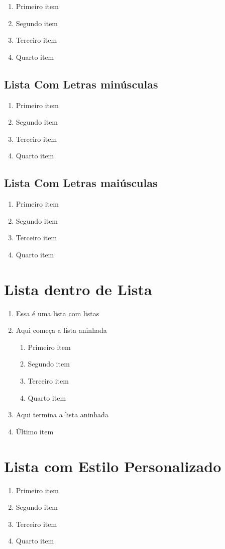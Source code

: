 \documentclass[12pt,a4paper]{article}
\begin{document}
\begin{enumerate}[label=\Roman*]
  \item Primeiro item
  \item Segundo item
  \item Terceiro item
  \item Quarto item
\end{enumerate}

\subsection{Lista Com Letras minúsculas}

\begin{enumerate}[label=\alph*]
  \item Primeiro item
  \item Segundo item
  \item Terceiro item
  \item Quarto item
\end{enumerate}

\subsection{Lista Com Letras maiúsculas}

\begin{enumerate}[label=\Alph*]
  \item Primeiro item
  \item Segundo item
  \item Terceiro item
  \item Quarto item
\end{enumerate}

\section{Lista dentro de Lista}

\begin{enumerate}
\item Essa é uma lista com listas
\item Aqui começa a lista aninhada
  \begin{enumerate}
  \item Primeiro item
  \item Segundo item
  \item Terceiro item
  \item Quarto item
  \end{enumerate}
\item Aqui termina a lista aninhada
\item Último item
\end{enumerate}

\section{Lista com Estilo Personalizado}

\begin{enumerate}[label=\textbf{Item \arabic*}]
  \item Primeiro item
  \item Segundo item
  \item Terceiro item
  \item Quarto item
\end{enumerate}
\end{document}
